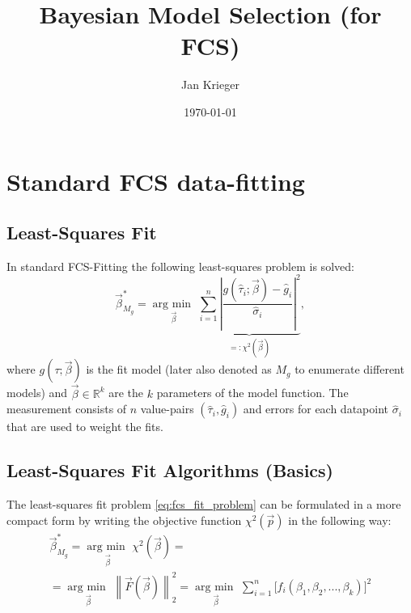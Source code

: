 \documentclass[a4paper,notitlepage]{article}
\DeclareMathOperator*{\argmin}{arg\:min\ }
\begin{document}
\title{Bayesian Model Selection (for FCS)}
\author{Jan Krieger}
\date{\today}
\maketitle
\tableofcontents

\section{Standard FCS data-fitting}
\subsection{Least-Squares Fit}
In standard FCS-Fitting the following least-squares problem is solved:
\begin{equation}\label{eq:fcs_fit_problem}
  \vec{\beta}_{M_g}^\ast=\argmin\limits_{\vec{\beta}}\underbrace{\sum\limits_{i=1}^n\left|\frac{g(\hat{\tau}_i;\vec{\beta})-\hat{g}_i}{\hat{\sigma}_i}\right|^2}_{=:\chi^2(\vec{\beta})},
\end{equation}
where $g(\tau;\vec{\beta})$ is the fit model (later also denoted as $M_g$ to enumerate different models) and $\vec{\beta}\in\mathbb{R}^k$ are the $k$ parameters of the model function. The measurement consists of $n$ value-pairs $(\hat{\tau}_i,\hat{g}_i)$ and errors for each datapoint $\hat{\sigma}_i$ that are used to weight the fits.

\subsection{Least-Squares Fit Algorithms (Basics)}
The least-squares fit problem \eqref{eq:fcs_fit_problem} can be formulated in a more compact form by writing the objective function $\chi^2(\vec{p})$ in the following way:
\begin{multline}\label{eq:fcs_fit_problem_forfit}
  \vec{\beta}_{M_g}^\ast=\argmin\limits_{\vec{\beta}}\chi^2(\vec{\beta})=\\
  =\argmin\limits_{\vec{\beta}}\left\|\vec{F}(\vec{\beta})\right\|_2^2=\argmin\limits_{\vec{\beta}}\sum\limits_{i=1}^n\bigl[f_i(\beta_1,\beta_2,...,\beta_k)\bigr]^2
\end{multline}
\end{document}
